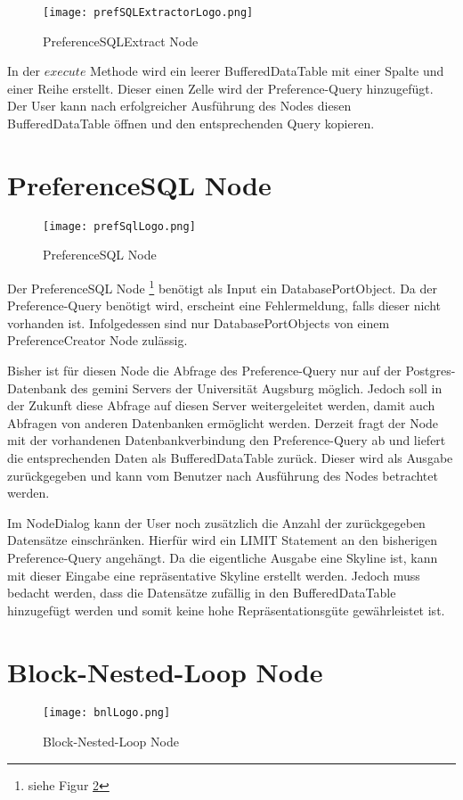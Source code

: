\begin{figure}[H]
	\centering
	\texttt{[image: prefSQLExtractorLogo.png]}
	\caption{PreferenceSQLExtract Node}
	\label{img:prefSQLExtractorLogo}
\end{figure}

In der $execute$ Methode wird ein leerer BufferedDataTable mit einer Spalte und einer Reihe erstellt. Dieser einen Zelle wird der Preference-Query hinzugefügt. Der User kann nach erfolgreicher Ausführung des Nodes diesen BufferedDataTable öffnen und den entsprechenden Query kopieren.
\section{PreferenceSQL Node}
\label{ch:Implementierung:sec:prefSQL}
\begin{figure}[H]
	\centering
	\texttt{[image: prefSqlLogo.png]}
	\caption{PreferenceSQL Node}
	\label{img:prefSQLLogo}
\end{figure}

Der PreferenceSQL Node \footnote{siehe Figur \ref{img:prefSQLLogo}} benötigt als Input ein DatabasePortObject. Da der Preference-Query benötigt wird, erscheint eine Fehlermeldung, falls dieser nicht vorhanden ist. Infolgedessen sind nur DatabasePortObjects von einem PreferenceCreator Node zulässig.

Bisher ist für diesen Node die Abfrage des Preference-Query nur auf der Postgres-Datenbank des gemini Servers der Universität Augsburg möglich. Jedoch soll in der Zukunft diese Abfrage auf diesen Server weitergeleitet werden, damit auch Abfragen von anderen Datenbanken ermöglicht werden.
Derzeit fragt der Node mit der vorhandenen Datenbankverbindung den Preference-Query ab und liefert die entsprechenden Daten als BufferedDataTable zurück. Dieser wird als Ausgabe zurückgegeben und kann vom Benutzer nach Ausführung des Nodes betrachtet werden.

Im NodeDialog kann der User noch zusätzlich die Anzahl der zurückgegeben Datensätze einschränken. Hierfür wird ein LIMIT Statement an den bisherigen Preference-Query angehängt. Da die eigentliche Ausgabe eine Skyline ist, kann mit dieser Eingabe eine repräsentative Skyline erstellt werden. Jedoch muss bedacht werden, dass die Datensätze zufällig in den BufferedDataTable hinzugefügt werden und somit keine hohe Repräsentationsgüte gewährleistet ist.
\section{Block-Nested-Loop Node}
\label{ch:Implementierung:sec:bnlNode}
\begin{figure}[H]
	\centering
	\texttt{[image: bnlLogo.png]}
	\caption{Block-Nested-Loop Node}
	\label{img:bnlLogo}
\end{figure}

